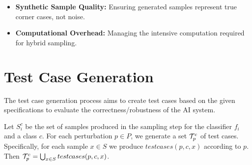 \begin{tcolorbox}[colback=purple!2!white, colframe=purple, title=Challenges in Sampling]
  \begin{itemize}
    \item \textbf{Synthetic Sample Quality:} Ensuring generated samples represent true corner cases, not noise.
    \item \textbf{Computational Overhead:} Managing the intensive computation required for hybrid sampling.
  \end{itemize}
\end{tcolorbox}


\section{Test Case Generation}

The test case generation process aims to create test cases based on the given specifications to evaluate the correctness/robustness of the AI system.

Let $S_i^c$ be the set of samples produced in the sampling step for the classifier $f_i$ and a class $c$. For each perturbation $p\in P$, we generate a set $\mathcal{T}_p^c$ of test cases. Specifically, for each sample $x\in S$ we produce $testcases(p,c,x)$ according to $p$. Then $\mathcal{T}_p^c = \bigcup_{x\in S} testcases(p,c,x)$.

